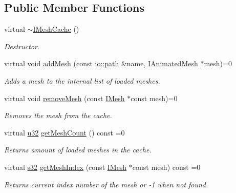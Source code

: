\subsection*{Public Member Functions}
\begin{DoxyCompactItemize}
\item 
\mbox{\label{classirr_1_1scene_1_1IMeshCache_a6d1bfbd0bda8a559d85cfd6735bc0667}} 
virtual \hyperlink{classirr_1_1scene_1_1IMeshCache_a6d1bfbd0bda8a559d85cfd6735bc0667}{$\sim$\+I\+Mesh\+Cache} ()
\begin{DoxyCompactList}\small\item\em Destructor. \end{DoxyCompactList}\item 
virtual void \hyperlink{classirr_1_1scene_1_1IMeshCache_a2959812a3a393817b1db42761766c49b}{add\+Mesh} (const \hyperlink{namespaceirr_1_1io_ab1bdc45edb3f94d8319c02bc0f840ee1}{io\+::path} \&name, \hyperlink{classirr_1_1scene_1_1IAnimatedMesh}{I\+Animated\+Mesh} $\ast$mesh)=0
\begin{DoxyCompactList}\small\item\em Adds a mesh to the internal list of loaded meshes. \end{DoxyCompactList}\item 
virtual void \hyperlink{classirr_1_1scene_1_1IMeshCache_aa82078b06fdcaa332b44a59e4027f921}{remove\+Mesh} (const \hyperlink{classirr_1_1scene_1_1IMesh}{I\+Mesh} $\ast$const mesh)=0
\begin{DoxyCompactList}\small\item\em Removes the mesh from the cache. \end{DoxyCompactList}\item 
virtual \hyperlink{namespaceirr_a0416a53257075833e7002efd0a18e804}{u32} \hyperlink{classirr_1_1scene_1_1IMeshCache_a9dc99e46309a6ef494ef7672c9b49853}{get\+Mesh\+Count} () const =0
\begin{DoxyCompactList}\small\item\em Returns amount of loaded meshes in the cache. \end{DoxyCompactList}\item 
virtual \hyperlink{namespaceirr_ac66849b7a6ed16e30ebede579f9b47c6}{s32} \hyperlink{classirr_1_1scene_1_1IMeshCache_a2b3512bd3ff11d0b290fa5d2d580eb54}{get\+Mesh\+Index} (const \hyperlink{classirr_1_1scene_1_1IMesh}{I\+Mesh} $\ast$const mesh) const =0
\begin{DoxyCompactList}\small\item\em Returns current index number of the mesh or -\/1 when not found. \end{DoxyCompactList}\item 

\end{DoxyCompactItemize}
